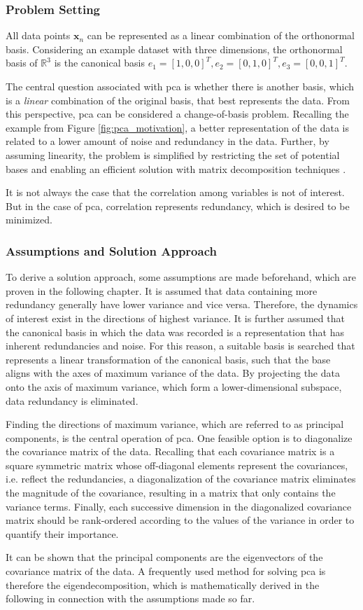\documentclass[../../../main.tex]{subfiles}
\begin{document}
\subsubsection{Problem Setting}

All data points $\bm{x}_n$ can be represented as a linear combination of the orthonormal basis. Considering an example dataset with three dimensions, the orthonormal basis of $\mathbb{R}^3$ is the canonical basis $e_1=[1,0,0]^T, e_2 = [0,1,0]^T, e_3=[0,0,1]^T$. 

The central question associated with \acrshort{pca} is whether there is another basis, which is a \textit{linear} combination of the original basis, that best represents the data. From this perspective, \acrshort{pca} can be considered a change-of-basis problem. Recalling the example from Figure \ref{fig:pca_motivation}, a better representation of the data is related to a lower amount of noise and redundancy in the data. Further, by assuming linearity, the problem is simplified by restricting the set of potential bases and enabling an efficient solution with matrix decomposition techniques \cite{shl_2014}.

It is not always the case that the correlation among variables is not of interest. But in the case of \acrshort{pca}, correlation represents redundancy, which is desired to be minimized.


\subsubsection{Assumptions and Solution Approach}

To derive a solution approach, some assumptions are made beforehand, which are proven in the following chapter. It is assumed that data containing more redundancy generally have lower variance and vice versa. Therefore, the dynamics of interest exist in the directions of highest variance. It is further assumed that the canonical basis in which the data was recorded is a representation that has inherent redundancies and noise. For this reason, a suitable basis is searched that represents a linear transformation of the canonical basis, such that the base aligns with the axes of maximum variance of the data. By projecting the data onto the axis of maximum variance, which form a lower-dimensional subspace, data redundancy is eliminated.

\vspace{1cm}

Finding the directions of maximum variance, which are referred to as principal components, is the central operation of \acrshort{pca}. One feasible option is to diagonalize the covariance matrix of the data. Recalling that each covariance matrix is a square symmetric matrix whose off-diagonal elements represent the covariances, i.e. reflect the redundancies, a diagonalization of the covariance matrix eliminates the magnitude of the covariance, resulting in a matrix that only contains the variance terms. Finally, each successive dimension in the diagonalized covariance matrix should be rank-ordered according to the values of the variance in order to quantify their importance.

It can be shown that the principal components are the eigenvectors of the covariance matrix of the data. A frequently used method for solving \acrshort{pca} is therefore the eigendecomposition, which is mathematically derived in the following in connection with the assumptions made so far.
\end{document}
